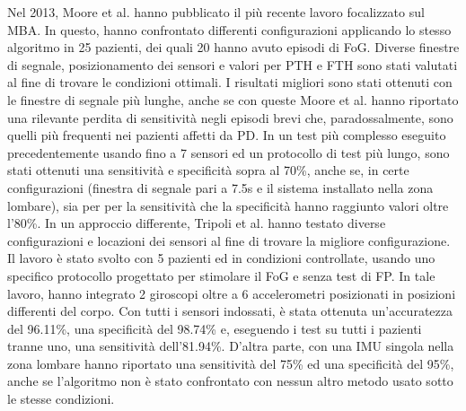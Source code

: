 Nel 2013, Moore et al. hanno pubblicato il più recente lavoro focalizzato sul MBA. In questo, hanno confrontato differenti configurazioni applicando lo stesso algoritmo in 25 pazienti, dei quali 20 hanno avuto episodi di FoG. Diverse finestre di segnale, posizionamento dei sensori e valori per PTH e FTH sono stati valutati al fine di trovare le condizioni ottimali. I risultati migliori sono stati ottenuti con le finestre di segnale più lunghe, anche se con queste Moore et al. hanno riportato una rilevante perdita di sensitività negli episodi brevi che, paradossalmente, sono quelli più frequenti nei pazienti affetti da PD\cite{27}. In un test più complesso eseguito precedentemente\cite{20} usando fino a 7 sensori ed un protocollo di test più lungo, sono stati ottenuti una sensitività e specificità sopra al 70\%, anche se, in certe configurazioni (finestra di segnale pari a 7.5s e il sistema installato nella zona lombare), sia per per la sensitività che la specificità hanno raggiunto valori oltre l'80\%. In un approccio differente, Tripoli et al. hanno testato diverse configurazioni e locazioni dei sensori al fine di trovare la migliore configurazione\cite{52}. Il lavoro è stato svolto con 5 pazienti ed in condizioni controllate, usando uno specifico protocollo progettato per stimolare il FoG e senza test di FP. In tale lavoro, hanno integrato 2 giroscopi oltre a 6 accelerometri posizionati in posizioni differenti del corpo. Con tutti i sensori indossati, è stata ottenuta un'accuratezza del 96.11\%, una specificità del 98.74\% e, eseguendo i test su tutti i pazienti tranne uno, una sensitività dell'81.94\%. D'altra parte, con una IMU singola nella zona lombare hanno riportato una sensitività del 75\% ed una specificità del 95\%, anche se l'algoritmo non è stato confrontato con nessun altro metodo usato sotto le stesse condizioni. \newline
